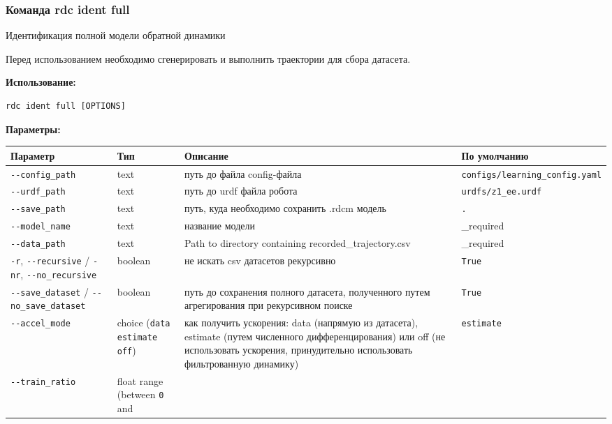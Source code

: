 \hypertarget{rdc-ident-full}{%
\subsubsection{ Команда rdc ident full}\label{rdc-ident-full}}

Идентификация полной модели обратной динамики

Перед использованием необходимо сгенерировать и выполнить траектории для сбора датасета.

\textbf{Использование:}
\begin{lstlisting}[language=python, numbers=none, frame=single]
rdc ident full [OPTIONS]
\end{lstlisting}

\textbf{Параметры:}
\begin{center}
\fontsize{10pt}{10pt}\selectfont
\begin{longtable}[]{p{5cm}|p{2cm}|p{3.5cm}|p{5cm}}
    \hline
\toprule()
Параметр & Тип & Описание & По умолчанию \\
\hline
\midrule()
\endhead
\texttt{-\/-config\_path} & text & путь до файла config-файла &
\texttt{configs/learning\_config.yaml} \\
\hline
\texttt{-\/-urdf\_path} & text & путь до urdf файла робота &
\texttt{urdfs/z1\_ee.urdf} \\
\hline
\texttt{-\/-save\_path} & text & путь, куда необходимо сохранить .rdcm модель &
\texttt{.} \\
\hline
\texttt{-\/-model\_name} & text & название модели & \_required \\
\hline
\texttt{-\/-data\_path} & text & Path to directory containing
recorded\_trajectory.csv & \_required \\
\hline
\texttt{-r}, \texttt{-\/-recursive} / \texttt{-nr},
\texttt{-\/-no\_recursive} & boolean & не искать csv датасетов рекурсивно &
\texttt{True} \\
\hline
\texttt{-\/-save\_dataset} / \texttt{-\/-no\_save\_dataset} & boolean &
путь до сохранения полного датасета, полученного путем агрегирования при рекурсивном поиске& \texttt{True} \\
\hline
\texttt{-\/-accel\_mode} & choice (\texttt{data} \textbar{}
\texttt{estimate} \textbar{} \texttt{off}) & как получить ускорения: data (напрямую из датасета), estimate (путем численного дифференцирования) или off (не использовать ускорения, принудительно использовать фильтрованную динамику) & \texttt{estimate} \\
\hline
\texttt{-\/-train\_ratio} & float range (between \texttt{0} and

\end{longtable}
\end{center}
